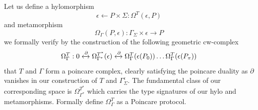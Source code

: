 \documentclass[runningheads]{llncs}
\begin{document}
Let us define a hylomorphism
\begin{equation}
\epsilon \leftarrow P \times \Sigma  : \Omega^T(\epsilon, P)
\end{equation}
and metamorphism
\begin{equation}
\Omega_\Gamma(P, \epsilon):\Gamma_\Sigma \times \epsilon \rightarrow P  
\end{equation} 
we formally verify by the construction of the following geometric cw-complex
\begin{equation}
\Omega^T_\Gamma: 0 \xleftrightarrow{\partial} \Omega^{T^*}_{\Gamma^*}(\epsilon) \xleftrightarrow{\partial} \Omega^T_\Gamma (\epsilon(P_0)) \dots \Omega^T_\Gamma (\epsilon(P_\pi))
\end{equation}
that $T$ and $\Gamma$ form a poincare complex, clearly satisfying the poincare duality as $\partial$ vanishes in our construction of $T$ and $\Gamma^\epsilon_\Sigma$. The fundamental class of our corresponding space is $\Omega^{T^*}_{\Gamma^*}$ which carries the type signatures of our hylo and metamorphisms. Formally define $\Omega^{T}_{\Gamma}$ as a Poincare protocol.
\end{document}
